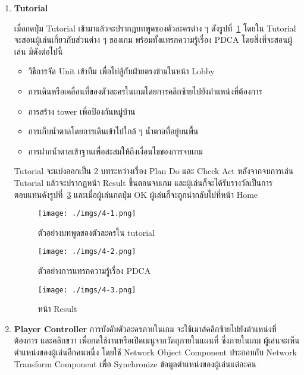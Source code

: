 \documentclass[12pt,oneside,openright,a4paper]{cpe-thai-project}
\begin{document}
\begin{enumerate}
  \item \textbf{Tutorial}
  
  เมื่อกดปุ่ม Tutorial เข้ามาแล้วจะปรากฎบทพูดของตัวละครต่าง ๆ ดังรูปที่~\ref{fig:4-1}
  โดยใน Tutorial จะสอนผู้เล่นเกี่ยวกับส่วนต่าง ๆ ของเกม พร้อมทั้งแทรกความรู้เรื่อง PDCA 
  โดยสิ่งที่จะสอนผู้เล่น มีดังต่อไปนี้
  \begin{itemize}
    \item วิธีการจัด Unit เข้าทีม เพื่อไปสู้กับฝ่ายตรงข้ามในหน้า Lobby 
    \item การเดินหรือเคลื่อนที่ของตัวละครในเกมโดยการคลิกซ้ายไปยังตำแหน่งที่ต้องการ
    \item การสร้าง tower เพื่อป้องกันหมู่บ้าน
    \item การเก็บน้ำตาลโดยการเดินเข้าไปใกล้ ๆ น้ำตาลที่อยู่บนพื้น
    \item การฝากน้ำตาลเข้าฐานเพื่อสะสมให้ถึงเงื่อนไขของการจบเกม
  \end{itemize}

  Tutorial จะแบ่งออกเป็น 2 บทระหว่างเรื่อง Plan Do และ Check Act 
  หลังจากจบการเล่น Tutorial แล้วจะปรากฏหน้า Result ขึ้นตอนจบเกม
  และผู้เล่นก็จะได้รับรางวัลเป็นการตอบแทนดังรูปที่~\ref{fig:4-3} และเมื่อผู้เล่นกดปุ่ม OK 
  ผู้เล่นก็จะถูกนำกลับไปที่หน้า Home

  \begin{figure}[H]\centering
    \texttt{[image: ./imgs/4-1.png]}
    \caption{ตัวอย่างบทพูดของตัวละครใน tutorial}\label{fig:4-1}
  \end{figure}

  \begin{figure}[H]\centering
    \texttt{[image: ./imgs/4-2.png]}
    \caption{ตัวอย่างการแทรกความรู้เรื่อง PDCA}\label{fig:4-2}
  \end{figure}

  \begin{figure}[H]\centering
    \texttt{[image: ./imgs/4-3.png]}
    \caption{หน้า Result}\label{fig:4-3}
  \end{figure}

  \item \textbf{Player Controller}
    การบังคับตัวละครภายในเกม จะใช้เมาส์คลิกซ้ายไปยังตำแหน่งที่ต้องการ 
    และคลิกขวา เพื่อกดใช้งานหรือเปิดเมนูจากวัตถุภายในแผนที่ ซึ่งภายในเกม
    ผู้เล่นจะเห็นตำแหน่งของผู้เล่นอีกคนหนึ่ง โดยใช้ Network Object Component 
    ประกอบกับ Network Transform Component เพื่อ Synchronize ข้อมูลตำแหน่งของผู้เล่นแต่ละคน


\end{enumerate}
\end{document}

